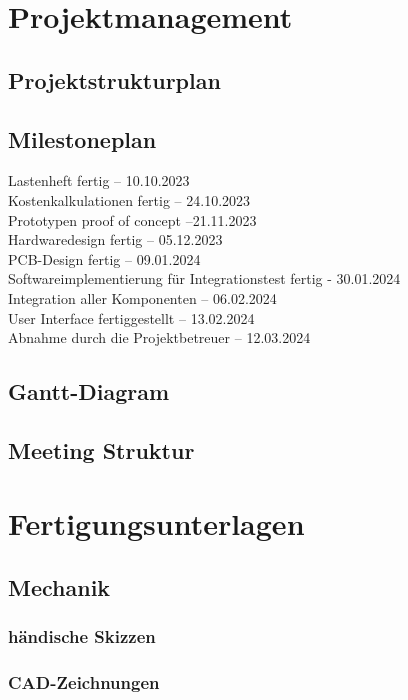 \documentclass[titlepage,12pt,twoside]{article}
\begin{document}
\section{Projektmanagement}
\subsection{Projektstrukturplan}
\subsection{Milestoneplan}
Lastenheft fertig – 10.10.2023 \\
Kostenkalkulationen fertig – 24.10.2023 \\
Prototypen proof of concept –21.11.2023 \\
Hardwaredesign fertig – 05.12.2023 \\
PCB-Design fertig – 09.01.2024 \\
Softwareimplementierung für Integrationstest fertig - 30.01.2024 \\
Integration aller Komponenten – 06.02.2024 \\
User Interface fertiggestellt – 13.02.2024 \\
Abnahme durch die Projektbetreuer – 12.03.2024

\subsection{Gantt-Diagram}
\subsection{Meeting Struktur}

\section{Fertigungsunterlagen}
\subsection{Mechanik}
\subsubsection{händische Skizzen}
\subsubsection{CAD-Zeichnungen}
\end{document}
